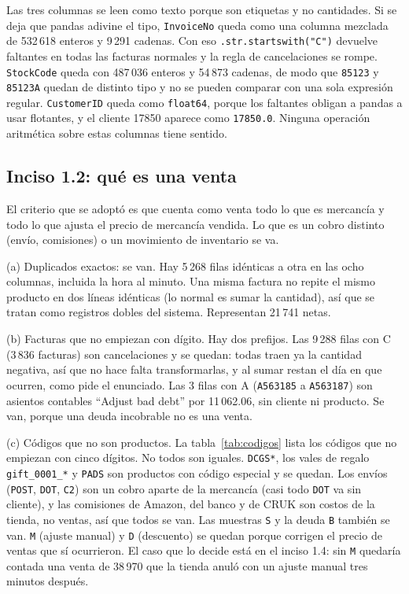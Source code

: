 \documentclass[11pt]{article}
\begin{document}
Las tres columnas se leen como texto porque son etiquetas y no cantidades. Si se deja que pandas
adivine el tipo, \texttt{InvoiceNo} queda como una columna mezclada de 532\,618 enteros y 9\,291
cadenas. Con eso \texttt{.str.startswith("C")} devuelve faltantes en todas las facturas
normales y la regla de cancelaciones se rompe. \texttt{StockCode} queda con 487\,036 enteros y
54\,873 cadenas, de modo que \texttt{85123} y \texttt{85123A} quedan de distinto tipo y no se
pueden comparar con una sola expresión regular. \texttt{CustomerID} queda como
\texttt{float64}, porque los faltantes obligan a pandas a usar flotantes, y el cliente 17850
aparece como \texttt{17850.0}. Ninguna operación aritmética sobre estas columnas tiene sentido.

\subsection*{Inciso 1.2: qué es una venta}

El criterio que se adoptó es que cuenta como venta todo lo que es mercancía y todo lo que ajusta
el precio de mercancía vendida. Lo que es un cobro distinto (envío, comisiones) o un movimiento
de inventario se va.

(a) Duplicados exactos: se van. Hay 5\,268 filas idénticas a otra en las ocho
columnas, incluida la hora al minuto. Una misma factura no repite el mismo producto en dos
líneas idénticas (lo normal es sumar la cantidad), así que se tratan como registros dobles del
sistema. Representan \textsterling{}21\,741 netas.

(b) Facturas que no empiezan con dígito. Hay dos prefijos. Las 9\,288 filas con C
(3\,836 facturas) son cancelaciones y se quedan: todas traen ya la cantidad negativa,
así que no hace falta transformarlas, y al sumar restan el día en que ocurren, como pide el
enunciado. Las 3 filas con A (\texttt{A563185} a \texttt{A563187}) son asientos contables
``Adjust bad debt'' por \textsterling{}11\,062.06, sin cliente ni producto. Se van, porque una
deuda incobrable no es una venta.

(c) Códigos que no son productos. La tabla~\ref{tab:codigos} lista los códigos que
no empiezan con cinco dígitos. No todos son iguales. \texttt{DCGS*}, los vales de regalo
\texttt{gift\_0001\_*} y \texttt{PADS} son productos con código especial y se quedan. Los
envíos (\texttt{POST}, \texttt{DOT}, \texttt{C2}) son un cobro aparte de la mercancía (casi todo
\texttt{DOT} va sin cliente), y las comisiones de Amazon, del banco y de CRUK son costos de la
tienda, no ventas, así que todos se van. Las muestras \texttt{S} y la deuda \texttt{B} también se
van. \texttt{M} (ajuste manual) y \texttt{D} (descuento) se quedan porque corrigen el precio de
ventas que sí ocurrieron. El caso que lo decide está en el inciso 1.4: sin \texttt{M} quedaría
contada una venta de \textsterling{}38\,970 que la tienda anuló con un ajuste manual tres minutos después.
\end{document}
